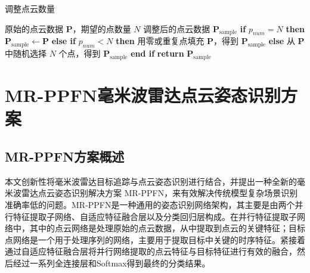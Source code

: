 \begin{algorithm}[htbp]
	\caption{调整点云数量}
	\label{alg:adjust_pointcloud}
	\begin{algorithmic}[1]
		\Require 原始的点云数据 $\mathbf{P}$，期望的点数量 $N$
		\Ensure 调整后的点云数据 $\mathbf{P}_{\text{sample}}$
		\State \textbf{if} $p_{num} = N$ \textbf{then}
		    \State \quad $\mathbf{P}_{\text{sample}} \gets \mathbf{P}$
		\State \textbf{else if} $p_{num} < N$ \textbf{then}
		    \State \quad 用零或重复点填充 $\mathbf{P}$，得到 $\mathbf{P}_{\text{sample}}$
		\State \textbf{else}
		    \State \quad 从 $\mathbf{P}$ 中随机选择 $N$ 个点，得到 $\mathbf{P}_{\text{sample}}$
		\State \textbf{end if}
		\State \textbf{return} $\mathbf{P}_{\text{sample}}$
	\end{algorithmic}
\end{algorithm}

\section{MR-PPFN毫米波雷达点云姿态识别方案}
\subsection{MR-PPFN方案概述}
本文创新性将毫米波雷达目标追踪与点云姿态识别进行结合，并提出一种全新的毫米波雷达点云姿态识别解决方案
MR-PPFN，来有效解决传统模型复杂场景识别准确率低的问题。MR-PPFN是一种通用的姿态识别网络架构，其主要是由两个并行特征提取子网络、自适应特征融合层以及分类回归层构成。在并行特征提取子网络中，其中的点云网络是处理原始的点云数据，从中提取到点云的关键特征；目标点网络是一个用于处理序列的网络，主要用于提取目标中关键的时序特征。紧接着通过自适应特征融合层将并行网络提取的点云特征与目标特征进行有效的融合，然后经过一系列全连接层和Softmax得到最终的分类结果。
